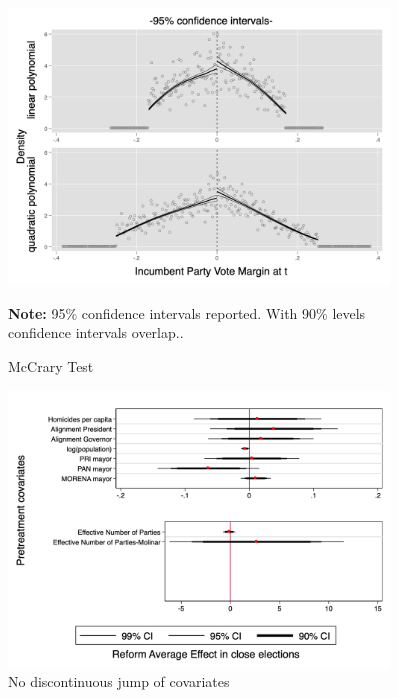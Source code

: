 \documentclass[12pt]{amsart}
\numberwithin{equation}{section}
\theoremstyle{definition}
\theoremstyle{definition}
\theoremstyle{definition}
\begin{document}
 \begin{figure}[H]   
\centering
 \caption{McCrary Test}
 \label{fig:mcrary}
\includegraphics[width=0.9\textwidth]{../Figures/conditional_mccrary_test_pol1_final.png}
       \captionsetup{justification=centering}
         
 \textbf{Note:} 95\% confidence intervals reported. With 90\% levels confidence intervals overlap..  
 
\end{figure} 

 \begin{figure}[H]   
\centering
 \caption{No discontinuous jump of covariates}
 \label{fig:parallel_trend}
\includegraphics[width=0.9\textwidth]{../Figures/nojump.png}
       \captionsetup{justification=centering}
    
   
\end{figure} 
\end{document}
